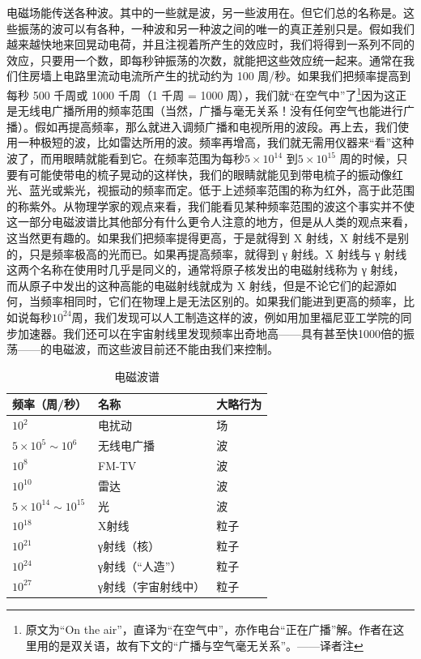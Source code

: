 电磁场能传送各种波。其中的一些就是波，另一些波用在。但它们总的名称是。这些振荡的波可以有各种，一种波和另一种波之间的唯一的真正差别只是。假如我们越来越快地来回晃动电荷，并且注视着所产生的效应时，我们将得到一系列不同的效应，只要用一个数，即每秒钟振荡的次数，就能把这些效应统一起来。通常在我们住房墙上电路里流动电流所产生的扰动约为 100 周/秒。如果我们把频率提高到每秒 500 千周或 1000 千周（1 千周 = 1000 周），我们就“在空气中”了\footnote{原文为“On the air”，直译为“在空气中”，亦作电台“正在广播”解。作者在这里用的是双关语，故有下文的“广播与空气毫无关系”。——译者注}因为这正是无线电广播所用的频率范围（当然，广播与毫无关系！没有任何空气也能进行广播）。假如再提高频率，那么就进入调频广播和电视所用的波段。再上去，我们使用一种极短的波，比如雷达所用的波。频率再增高，我们就无需用仪器来“看”这种波了，而用眼睛就能看到它。在频率范围为每秒$ 5\times10^{14} $  到$ 5\times10^{15}  $ 周的时候，只要有可能使带电的梳子晃动的这样快，我们的眼睛就能见到带电梳子的振动像红光、蓝光或紫光，视振动的频率而定。低于上述频率范围的称为红外，高于此范围的称紫外。从物理学家的观点来看，我们能看见某种频率范围的波这个事实并不使这一部分电磁波谱比其他部分有什么更令人注意的地方，但是从人类的观点来看，这当然更有趣的。如果我们把频率提得更高，于是就得到 X 射线，X 射线不是别的，只是频率极高的光而已。如果再提高频率，就得到 γ 射线。X 射线与 γ 射线这两个名称在使用时几乎是同义的，通常将原子核发出的电磁射线称为 γ 射线，而从原子中发出的这种高能的电磁射线就成为 X 射线，但是不论它们的起源如何，当频率相同时，它们在物理上是无法区别的。如果我们能进到更高的频率，比如说每秒$10^{24}$周，我们发现可以人工制造这样的波，例如用加里福尼亚工学院的同步加速器。我们还可以在宇宙射线里发现频率出奇地高——具有甚至快1000倍的振荡——的电磁波，而这些波目前还不能由我们来控制。

\begin{table}[H]
    \centering
    \label{tab:电磁波谱}
    \caption{电磁波谱}
    \medskip 
    \begin{tabular}{@{}lll@{}}
        \toprule
        频率（周/秒）                     & 名称         & 大略行为 \\ \midrule
        $10^{2}$                    & 电扰动        & 场    \\
        $5\times10^{5}\sim10^{6}$   & 无线电广播      & 波    \\
        $10^{8}$                    & FM-TV      & 波    \\
        $10^{10}$                   & 雷达         & 波    \\
        $5\times10^{14}\sim10^{15}$ & 光          & 波    \\
        $10^{18}$                   & X射线        & 粒子   \\
        $10^{21}$                   & γ射线（核）     & 粒子   \\
        $10^{24}$                   & γ射线（“人造”）  & 粒子   \\
        $10^{27}$                   & γ射线（宇宙射线中） & 粒子  \\ \bottomrule
    \end{tabular}
\end{table}


